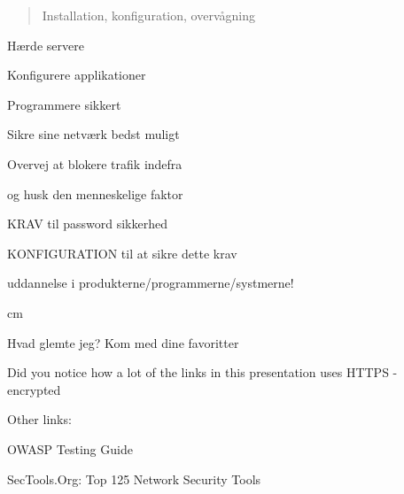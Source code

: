 \documentclass[20pt,landscape,a4paper,footrule]{foils}
\begin{document}

\begin{quote}\Large
Installation, konfiguration, overvågning
\end{quote}

\begin{list1}
\item Hærde servere
\item Konfigurere applikationer
\item Programmere sikkert
\item Sikre sine netværk bedst muligt
\item Overvej at blokere trafik indefra
\item og husk den menneskelige faktor
\item KRAV til password sikkerhed
\item KONFIGURATION til at sikre dette krav
\item uddannelse i produkterne/programmerne/systmerne!
\end{list1}






 cm

\centerline{\Large Hvad glemte jeg? Kom med dine favoritter \smiley}

Did you notice how a lot of the links in this presentation uses HTTPS - encrypted

Other links:

OWASP Testing Guide\\

SecTools.Org: Top 125 Network Security Tools\\



\myquestionspage
\end{document}
